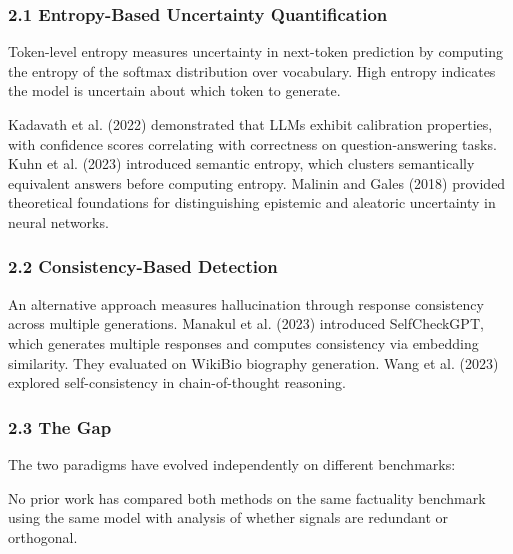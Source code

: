
\subsubsection{2.1 Entropy-Based Uncertainty Quantification}

Token-level entropy measures uncertainty in next-token prediction by computing the entropy of the softmax distribution over vocabulary. High entropy indicates the model is uncertain about which token to generate.

Kadavath et al. (2022) demonstrated that LLMs exhibit calibration properties, with confidence scores correlating with correctness on question-answering tasks. Kuhn et al. (2023) introduced semantic entropy, which clusters semantically equivalent answers before computing entropy. Malinin and Gales (2018) provided theoretical foundations for distinguishing epistemic and aleatoric uncertainty in neural networks.

\subsubsection{2.2 Consistency-Based Detection}

An alternative approach measures hallucination through response consistency across multiple generations. Manakul et al. (2023) introduced SelfCheckGPT, which generates multiple responses and computes consistency via embedding similarity. They evaluated on WikiBio biography generation. Wang et al. (2023) explored self-consistency in chain-of-thought reasoning.

\subsubsection{2.3 The Gap}

The two paradigms have evolved independently on different benchmarks:

\begin{table}[htbp]
\centering
{}
\end{table}

No prior work has compared both methods on the same factuality benchmark using the same model with analysis of whether signals are redundant or orthogonal.

